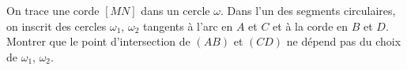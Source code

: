 On trace une corde $[MN]$ dans un cercle $\omega$. Dans l'un des segments circulaires, on inscrit des cercles $\omega_1$, $\omega_2$ tangents à l'arc en $A$ et $C$ et à la corde en $B$ et $D$. Montrer que le point d'intersection de $(AB)$ et $(CD)$ ne dépend pas du choix de $\omega_1$, $\omega_2$.
